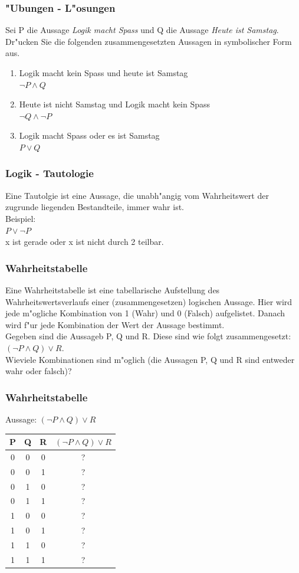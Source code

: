 \documentclass{beamer}
\begin{document}
\frame
{
	\frametitle{"Ubungen - L"osungen}
	Sei P die Aussage \emph{Logik macht Spass} und Q die Aussage \emph{Heute ist Samstag}.
	Dr"ucken Sie die folgenden zusammengesetzten Aussagen in symbolischer Form
	aus.
	\begin{enumerate}
	\item Logik macht kein Spass und heute ist Samstag\\
	$\lnot P \land Q$
	\item Heute ist nicht Samstag und Logik macht kein Spass\\
	$\lnot Q \land \lnot P$
	\item Logik macht Spass oder es ist Samstag\\
	$P \lor Q$
	\end{enumerate}
}

\frame
{
	\frametitle{Logik - Tautologie}
	Eine Tautolgie ist eine Aussage, die unabh"angig vom Wahrheitswert der
	zugrunde liegenden Bestandteile, immer wahr ist.\\
	\vspace{4mm}
	Beispiel:\\
	$P \lor \lnot P$\\
	x ist gerade oder x ist nicht durch 2 teilbar.
	
}

\frame
{
	\frametitle{Wahrheitstabelle}
	Eine Wahrheitstabelle ist eine tabellarische Aufstellung des Wahrheitswertsverlaufs einer
	(zusammengesetzen) logischen Aussage. Hier wird jede m"ogliche Kombination von
	1 (Wahr) und 0 (Falsch) aufgelistet. Danach wird f"ur jede Kombination der 
	Wert der Aussage bestimmt.\\
	Gegeben sind die Aussageb P, Q und R. Diese sind wie folgt zusammengesetzt: $(\lnot P \land Q) \lor R$.\\
	Wieviele Kombinationen sind m"oglich (die Aussagen P, Q und R sind entweder wahr oder falsch)?
}

\frame
{
	\frametitle{Wahrheitstabelle}
	Aussage: $(\lnot P \land Q) \lor R$\\
	\vspace{4mm}
	\begin{tabular}{c|c|c|c}
	P & Q & R & $(\lnot P \land Q) \lor R$ \\
	\hline
	0 & 0 & 0 & ?\\
	0 & 0 & 1 & ?\\
	0 & 1 & 0 & ?\\
	0 & 1 & 1 & ?\\
	1 & 0 & 0 & ?\\
	1 & 0 & 1 & ?\\
	1 & 1 & 0 & ?\\
	1 & 1 & 1 & ?\\
	\end{tabular}
}
\end{document}
